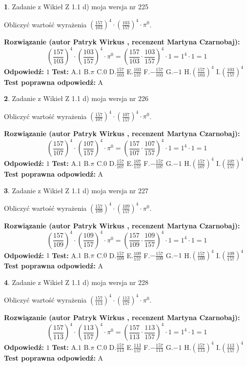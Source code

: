 \documentclass[12pt, a4paper]{article}
\theoremstyle{definition} %
\newtheorem{zad}{}
\newcommand{\zadStart}[1]{\begin{zad}#1\newline}
\newcommand{\zadStop}{\end{zad}}
\newcommand{\rozwStart}[2]{\noindent \textbf{Rozwiązanie (autor #1 , recenzent #2): }\newline}
\newcommand{\rozwStop}{\newline}
\newcommand{\odpStart}{\noindent \textbf{Odpowiedź:}\newline}
\newcommand{\odpStop}{\newline}
\newcommand{\testStart}{\noindent \textbf{Test:}\newline}
\newcommand{\testStop}{\newline}
\newcommand{\kluczStart}{\noindent \textbf{Test poprawna odpowiedź:}\newline}
\newcommand{\kluczStop}{\newline}
\begin{document}
\zadStart{Zadanie z Wikieł Z 1.1 d) moja wersja nr 225}

Obliczyć wartość wyrażenia $(\frac{157}{103})^{4} \cdot (\frac{103}{157})^{4} \cdot \pi^{0}$.
\zadStop
\rozwStart{Patryk Wirkus}{Martyna Czarnobaj}
$$(\frac{157}{103})^{4} \cdot (\frac{103}{157})^{4} \cdot \pi^{0} = (\frac{157}{103} \cdot \frac{103}{157})^{4} \cdot 1 = 1^{4} \cdot 1 = 1$$
\rozwStop
\odpStart
$1$
\odpStop
\testStart
A.$1$ B.$\pi$ C.$0$ D.$\frac{157}{103}$ E.$\frac{103}{157}$
F.$-\frac{157}{103}$ G.$-1$
H.$(\frac{157}{103})^{4}$
I.$(\frac{103}{157})^{4}$
\testStop
\kluczStart
A
\kluczStop



\zadStart{Zadanie z Wikieł Z 1.1 d) moja wersja nr 226}

Obliczyć wartość wyrażenia $(\frac{157}{107})^{4} \cdot (\frac{107}{157})^{4} \cdot \pi^{0}$.
\zadStop
\rozwStart{Patryk Wirkus}{Martyna Czarnobaj}
$$(\frac{157}{107})^{4} \cdot (\frac{107}{157})^{4} \cdot \pi^{0} = (\frac{157}{107} \cdot \frac{107}{157})^{4} \cdot 1 = 1^{4} \cdot 1 = 1$$
\rozwStop
\odpStart
$1$
\odpStop
\testStart
A.$1$ B.$\pi$ C.$0$ D.$\frac{157}{107}$ E.$\frac{107}{157}$
F.$-\frac{157}{107}$ G.$-1$
H.$(\frac{157}{107})^{4}$
I.$(\frac{107}{157})^{4}$
\testStop
\kluczStart
A
\kluczStop



\zadStart{Zadanie z Wikieł Z 1.1 d) moja wersja nr 227}

Obliczyć wartość wyrażenia $(\frac{157}{109})^{4} \cdot (\frac{109}{157})^{4} \cdot \pi^{0}$.
\zadStop
\rozwStart{Patryk Wirkus}{Martyna Czarnobaj}
$$(\frac{157}{109})^{4} \cdot (\frac{109}{157})^{4} \cdot \pi^{0} = (\frac{157}{109} \cdot \frac{109}{157})^{4} \cdot 1 = 1^{4} \cdot 1 = 1$$
\rozwStop
\odpStart
$1$
\odpStop
\testStart
A.$1$ B.$\pi$ C.$0$ D.$\frac{157}{109}$ E.$\frac{109}{157}$
F.$-\frac{157}{109}$ G.$-1$
H.$(\frac{157}{109})^{4}$
I.$(\frac{109}{157})^{4}$
\testStop
\kluczStart
A
\kluczStop



\zadStart{Zadanie z Wikieł Z 1.1 d) moja wersja nr 228}

Obliczyć wartość wyrażenia $(\frac{157}{113})^{4} \cdot (\frac{113}{157})^{4} \cdot \pi^{0}$.
\zadStop
\rozwStart{Patryk Wirkus}{Martyna Czarnobaj}
$$(\frac{157}{113})^{4} \cdot (\frac{113}{157})^{4} \cdot \pi^{0} = (\frac{157}{113} \cdot \frac{113}{157})^{4} \cdot 1 = 1^{4} \cdot 1 = 1$$
\rozwStop
\odpStart
$1$
\odpStop
\testStart
A.$1$ B.$\pi$ C.$0$ D.$\frac{157}{113}$ E.$\frac{113}{157}$
F.$-\frac{157}{113}$ G.$-1$
H.$(\frac{157}{113})^{4}$
I.$(\frac{113}{157})^{4}$
\testStop
\kluczStart
A
\kluczStop
\end{document}
